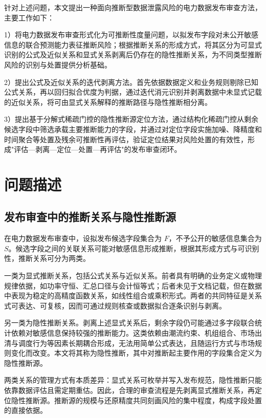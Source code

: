 \documentclass[UTF8,zihao=5,twoside,fontset=none]{ctexart}
\begin{document}
针对上述问题，本文提出一种面向推断型数据泄露风险的电力数据发布审查方法，主要工作如下：

1）将电力数据发布审查形式化为可推断性度量问题，以拟发布字段对未公开敏感信息的联合预测能力表征推断风险；根据推断关系的形成方式，将其区分为可显式识别的公式及近似关系和显式关系剥离后仍存在的隐性推断关系，为不同类型推断风险的识别与处置提供分析基础。

2）提出公式及近似关系的迭代剥离方法。首先依据数据定义和业务规则剔除已知公式关系，再以回归拟合优度为判据，通过迭代消元识别并剥离数据中未显式记载的近似关系，将可由显式关系解释的推断路径与隐性推断相分离。

3）提出基于分解式稀疏门控的隐性推断源定位方法，通过结构化稀疏门控从剩余候选字段中筛选承载主要推断能力的字段，并通过对定位字段实施加噪、降精度和时间聚合等处置及残余可推断性再评估，验证定位结果对风险处置的有效性，形成"评估—剥离—定位—处置—再评估"的发布审查闭环。

\section{问题描述}

{\color{blue}
\subsection{发布审查中的推断关系与隐性推断源}

在电力数据发布审查中，设拟发布候选字段集合为 $F$，不予公开的敏感信息集合为 $S$。候选字段之间的关联关系可能对敏感信息形成推断，根据其形成方式与可识别性，推断关系可分为两类。

一类为显式推断关系，包括公式关系与近似关系。前者具有明确的业务定义或物理规律依据，如功率守恒、汇总口径与会计恒等式；后者未见于文档记载，但在数据中表现为稳定的高精度函数关系，如线性组合或乘积形式。两者的共同特征是关系式可表达、可复核，因而可通过规则核查或数据拟合逐条识别与剥离。

另一类为隐性推断关系。剥离上述显式关系后，剩余字段仍可能通过多字段联合统计依赖对敏感信息保持较强的推断能力。这类依赖由潮流约束、机组组合、市场出清与调度行为等因素长期耦合形成，无法用简单公式表达，且随运行方式与市场规则变化而改变。本文将其称为隐性推断，其中对推断起主要作用的字段集合定义为隐性推断源。

两类关系的管理方式有本质差异：显式关系可枚举并写入发布规范，隐性推断只能依靠数据评估且需定期重估。因此，合理的审查流程是先剥离显式推断关系，再定位隐性推断源。推断源的规模与还原精度共同刻画风险的集中程度，构成字段处置的直接依据。
}
\end{document}
